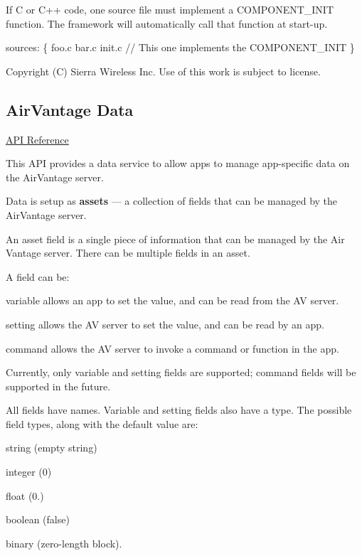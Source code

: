 If C or C++ code, one source file must implement a {\ttfamily C\+O\+M\+P\+O\+N\+E\+N\+T\+\_\+\+I\+N\+I\+T} function. The framework will automatically call that function at start-\/up.


\begin{DoxyCode}
sources:
\{
    foo.c
    bar.c
    init.c      \textcolor{comment}{// This one implements the COMPONENT\_INIT}
\}
\end{DoxyCode}






Copyright (C) Sierra Wireless Inc. Use of this work is subject to license. \hypertarget{c_le_avdata}{}\subsection{Air\+Vantage Data}\label{c_le_avdata}
\hyperlink{le__avdata__interface_8h}{A\+P\+I Reference}





This A\+P\+I provides a data service to allow apps to manage app-\/specific data on the Air\+Vantage server.

Data is setup as {\bfseries assets} --- a collection of fields that can be managed by the Air\+Vantage server.

An asset field is a single piece of information that can be managed by the Air Vantage server. There can be multiple fields in an asset.

A field can be\+:
\begin{DoxyItemize}
\item {\ttfamily variable} allows an app to set the value, and can be read from the A\+V server.
\item {\ttfamily setting} allows the A\+V server to set the value, and can be read by an app.
\item {\ttfamily command} allows the A\+V server to invoke a command or function in the app.
\end{DoxyItemize}

Currently, only variable and setting fields are supported; command fields will be supported in the future.

All fields have names. Variable and setting fields also have a type. The possible field types, along with the default value are\+:
\begin{DoxyItemize}
\item string (empty string)
\item integer (0)
\item float (0.)
\item boolean (false)
\item binary (zero-\/length block).
\end{DoxyItemize}

